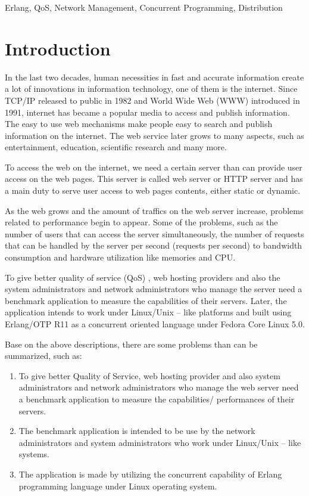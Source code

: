 \documentclass[final,
notitlepage,
narroweqnarray,
    inline,
    twoside,
]{ieee}
\begin{document}
\begin{keywords}
Erlang, QoS, Network Management, Concurrent Programming,
Distribution
\end{keywords}

\section{Introduction}


\PARstart In the last two decades, human necessities in fast and
accurate information create a lot of innovations in information
technology, one of them is the internet. Since TCP/IP released to
public in 1982 and World Wide Web (WWW) introduced in 1991,
internet has became a popular media to access and publish
information. The easy to use web mechanisms make people easy to
search and publish information on the internet. The web service
later grows to many aspects, such as entertainment, education,
scientific research and many more.


To access the web on the internet, we need a certain server than
can provide user access on the web pages. This server is called
web server or HTTP server and has a main duty to serve user access
to web pages contents, either static or dynamic.


As the web grows and the amount of traffics on the web server
increase, problems related to performance begin to appear. Some of
the problems, such as the number of users that can access the
server simultaneously, the number of requests that can be handled
by the server per second (requests per second) to bandwidth
consumption and hardware utilization like memories and CPU.

To give better quality of service (QoS) , web hosting providers
and also the system administrators and network administrators who
manage the server need a benchmark application to measure the
capabilities of their servers. Later, the application intends to
work under Linux/Unix -- like platforms and built using Erlang/OTP
R11 as a concurrent oriented language under Fedora Core Linux 5.0.

Base on the above descriptions, there are some problems than can be summarized, such as:

\begin{enumerate}
\item To give better Quality of Service, web hosting provider and
also system administrators and network administrators who manage
the web server need a benchmark application to measure the
capabilities/ performances of their servers.

\item The benchmark application is intended to be use by the
network administrators and system administrators who work under
Linux/Unix -- like systems.

\item The application is made by utilizing the concurrent
capability of Erlang programming language under Linux operating
system.
\end{enumerate}
\end{document}
